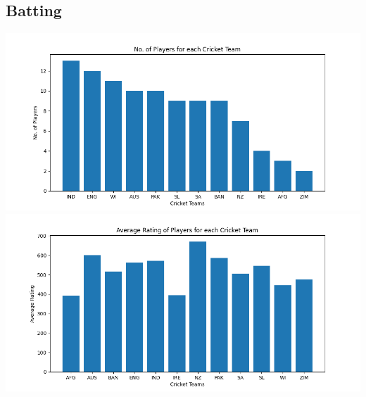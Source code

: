 \documentclass{article}
\begin{document}
\begin{normalsize}
            \subsection{Batting}\label{subsec:batting3}
                \includegraphics[scale=0.7]{test_batting-1}
                \vspace{1em}\\
                \includegraphics[scale=0.7]{test_batting-2}

\end{normalsize}
\end{document}
